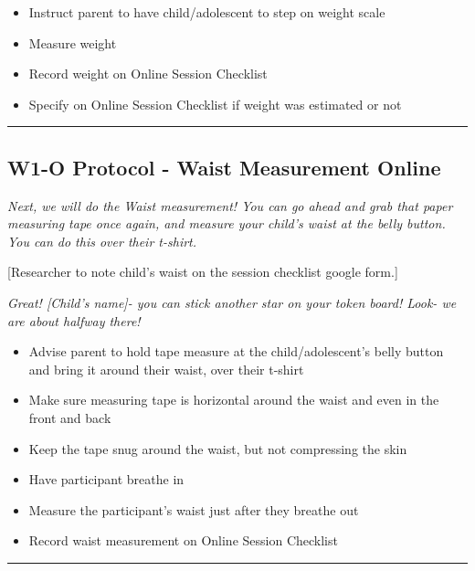 \documentclass[]{book}
\providecommand{\tightlist}{%
  \setlength{\itemsep}{0pt}\setlength{\parskip}{0pt}}
\begin{document}
\begin{itemize}
\tightlist
\item
  Instruct parent to have child/adolescent to step on weight scale
\item
  Measure weight
\item
  Record weight on Online Session Checklist
\item
  Specify on Online Session Checklist if weight was estimated or not
\end{itemize}

\begin{center}\rule{0.5\linewidth}{0.5pt}\end{center}

\hypertarget{w1-o-protocol---waist-measurement-online}{%
\subsection{W1-O Protocol - Waist Measurement Online}\label{w1-o-protocol---waist-measurement-online}}

\emph{Next, we will do the Waist measurement! You can go ahead and grab that paper measuring tape once again, and measure your child's waist at the belly button. You can do this over their t-shirt.}

{[}Researcher to note child's waist on the session checklist google form.{]}

\emph{Great! {[}Child's name{]}- you can stick another star on your token board! Look- we are about halfway there!}

\begin{itemize}
\tightlist
\item
  Advise parent to hold tape measure at the child/adolescent's belly button and bring it around their waist, over their t-shirt
\item
  Make sure measuring tape is horizontal around the waist and even in the front and back
\item
  Keep the tape snug around the waist, but not compressing the skin
\item
  Have participant breathe in
\item
  Measure the participant's waist just after they breathe out
\item
  Record waist measurement on Online Session Checklist
\end{itemize}

\begin{center}\rule{0.5\linewidth}{0.5pt}\end{center}
\end{document}
